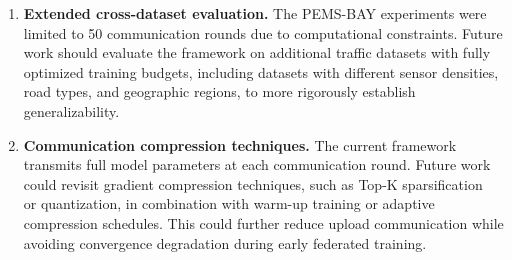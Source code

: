 \begin{enumerate}
    \item \textbf{Extended cross-dataset evaluation.} The PEMS-BAY experiments were limited to 50 communication rounds due to computational constraints. Future work should evaluate the framework on additional traffic datasets with fully optimized training budgets, including datasets with different sensor densities, road types, and geographic regions, to more rigorously establish generalizability.

    \item \textbf{Communication compression techniques.} The current framework transmits full model parameters at each communication round. Future work could revisit gradient compression techniques, such as Top-K sparsification~\cite{gao2024fedce} or quantization, in combination with warm-up training or adaptive compression schedules. This could further reduce upload communication while avoiding convergence degradation during early federated training.
\end{enumerate}
